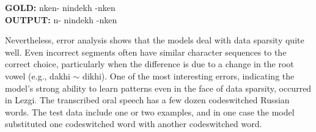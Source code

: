 \pex   
\label{ex:alaserrors}
\a \textbf{GOLD:} \hspace{2mm} n\textlangle{}\textrangle{}ken- \hspace{1mm} nindekh \hspace{1mm} -n\textlangle{}\textrangle{}ken \\
\textbf{OUTPUT:} \hspace{2mm} n- \hspace{5mm} nindekh \hspace{2mm} -n\textlangle{}\textrangle{}ken
\xe



Nevertheless, error analysis shows that the models deal with data sparsity quite well. Even incorrect segments often have similar character sequences to the correct choice, particularly when the difference is due to a change in the root vowel (e.g., dakhi $\sim$ dikhi). One of the most interesting errors, indicating the model's strong ability to learn patterns even in the face of data sparsity, occurred in Lezgi. The transcribed oral speech has a few dozen codeswitched Russian words. The test data include one or two examples, and in one case the model substituted one codeswitched word with another codeswitched word. 

